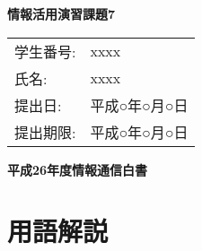 \topmargin=-1.5cm
\textwidth=17cm
\textheight=25cm
\oddsidemargin=-0.5cm
\evensidemargin=-0.5cm


\begin{center}
  \Large\bf 情報活用演習課題7
\end{center}

\begin{flushright}
  \begin{tabular}{ll}
    学生番号: & xxxx \\
    氏名:     & xxxx \\
    提出日:   & 平成○年○月○日 \\
    提出期限: & 平成○年○月○日 \\
  \end{tabular}
\end{flushright}

\begin{center}
  \large\bf 
  平成26年度情報通信白書
\end{center}

\section{用語解説}


